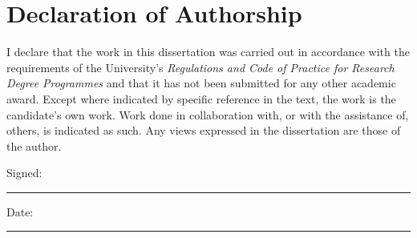 \chapter*{Declaration of Authorship}

I declare that the work in this dissertation was carried out in accordance with the 
requirements of the University's \emph{Regulations and Code of Practice for Research Degree Programmes}
and that it has not been submitted for any other academic award. 
Except where indicated by specific reference in the text, the work is the candidate's own work. 
Work done in collaboration with, or with the assistance of, others, is indicated as such. 
Any views expressed in the dissertation are those of the author.


\vspace{1.5cm}
Signed: 
\begin{center}
    \rule{12cm}{0.25mm}
\end{center}

\vspace{1.5cm}
Date: 
\begin{center}
    \rule{12cm}{0.25mm}
\end{center}

